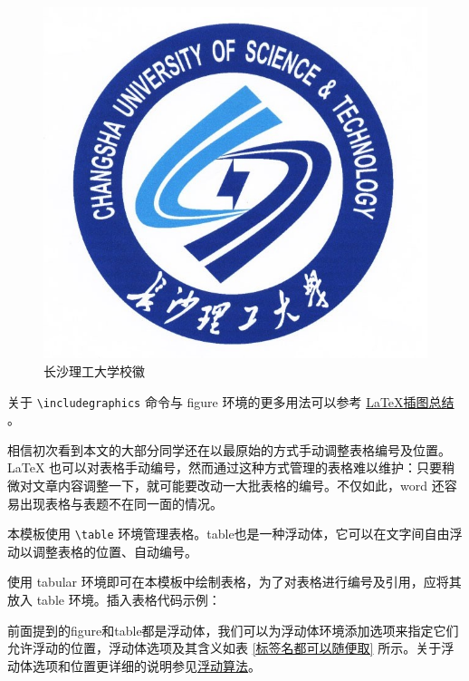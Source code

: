 \begin{figure}[htbp]  %
  \centering  %
  \includegraphics[scale=.5]{figure/csustlogo_626by572.jpg}  %
  \caption{长沙理工大学校徽}  %
  \label{fig.csustlogo}  %
\end{figure}

关于 \verb!\includegraphics! 命令与 figure 环境的更多用法可以参考 \href{https://zhuanlan.zhihu.com/p/262389031}{\LaTeX{}插图总结} 。


相信初次看到本文的大部分同学还在以最原始的方式手动调整表格编号及位置。 \LaTeX{} 也可以对表格手动编号，然而通过这种方式管理的表格难以维护：只要稍微对文章内容调整一下，就可能要改动一大批表格的编号。不仅如此，word 还容易出现表格与表题不在同一面的情况。

本模板使用 \verb!\table! 环境管理表格。table也是一种浮动体，它可以在文字间自由浮动以调整表格的位置、自动编号。

使用 tabular 环境即可在本模板中绘制表格，为了对表格进行编号及引用，应将其放入 table 环境。插入表格代码示例：

前面提到的figure和table都是浮动体，我们可以为浮动体环境添加选项来指定它们允许浮动的位置，浮动体选项及其含义如表 \ref{标签名都可以随便取} 所示。关于浮动体选项和位置更详细的说明参见\href{https://www.latexstudio.net/archives/10043.html}{浮动算法}。

